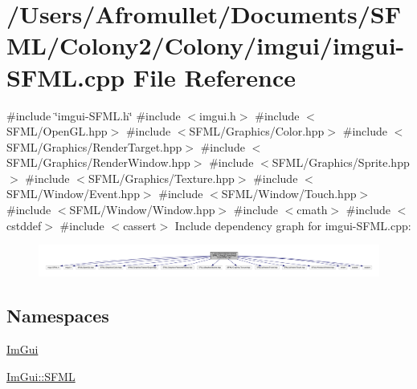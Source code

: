 \hypertarget{imgui-_s_f_m_l_8cpp}{}\section{/\+Users/\+Afromullet/\+Documents/\+S\+F\+M\+L/\+Colony2/\+Colony/imgui/imgui-\/S\+F\+M\+L.\+cpp File Reference}
\label{imgui-_s_f_m_l_8cpp}
{\ttfamily \#include \char`\"{}imgui-\/\+S\+F\+M\+L.\+h\char`\"{}}\newline
{\ttfamily \#include $<$imgui.\+h$>$}\newline
{\ttfamily \#include $<$S\+F\+M\+L/\+Open\+G\+L.\+hpp$>$}\newline
{\ttfamily \#include $<$S\+F\+M\+L/\+Graphics/\+Color.\+hpp$>$}\newline
{\ttfamily \#include $<$S\+F\+M\+L/\+Graphics/\+Render\+Target.\+hpp$>$}\newline
{\ttfamily \#include $<$S\+F\+M\+L/\+Graphics/\+Render\+Window.\+hpp$>$}\newline
{\ttfamily \#include $<$S\+F\+M\+L/\+Graphics/\+Sprite.\+hpp$>$}\newline
{\ttfamily \#include $<$S\+F\+M\+L/\+Graphics/\+Texture.\+hpp$>$}\newline
{\ttfamily \#include $<$S\+F\+M\+L/\+Window/\+Event.\+hpp$>$}\newline
{\ttfamily \#include $<$S\+F\+M\+L/\+Window/\+Touch.\+hpp$>$}\newline
{\ttfamily \#include $<$S\+F\+M\+L/\+Window/\+Window.\+hpp$>$}\newline
{\ttfamily \#include $<$cmath$>$}\newline
{\ttfamily \#include $<$cstddef$>$}\newline
{\ttfamily \#include $<$cassert$>$}\newline
Include dependency graph for imgui-\/S\+F\+M\+L.\+cpp\+:
\nopagebreak
\begin{figure}[H]
\begin{center}
\leavevmode
\includegraphics[width=350pt]{d1/dd0/imgui-_s_f_m_l_8cpp__incl}
\end{center}
\end{figure}
\subsection*{Namespaces}
\begin{DoxyCompactItemize}
\item 
 \mbox{\hyperlink{namespace_im_gui}{Im\+Gui}}
\item 
 \mbox{\hyperlink{namespace_im_gui_1_1_s_f_m_l}{Im\+Gui\+::\+S\+F\+ML}}
\end{DoxyCompactItemize}
